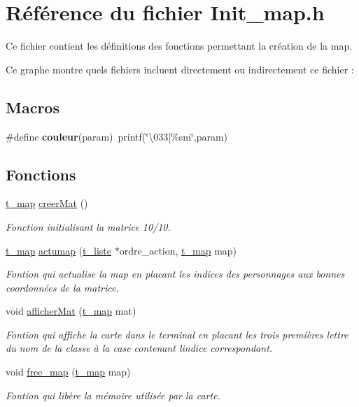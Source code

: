 \hypertarget{a00023}{}\section{Référence du fichier Init\+\_\+map.\+h}
\label{a00023}


Ce fichier contient les définitions des fonctions permettant la création de la map.  


Ce graphe montre quels fichiers incluent directement ou indirectement ce fichier \+:
\subsection*{Macros}
\begin{DoxyCompactItemize}
\item 
\#define {\bfseries couleur}(param)~printf(\char`\"{}\textbackslash{}033\mbox{[}\%sm\char`\"{},param)\hypertarget{a00023_aabcb2d6536b6c0ab41f99493c911489b}{}\label{a00023_aabcb2d6536b6c0ab41f99493c911489b}

\end{DoxyCompactItemize}
\subsection*{Fonctions}
\begin{DoxyCompactItemize}
\item 
\hyperlink{a00007}{t\+\_\+map} \hyperlink{a00023_aa36880d730a94fe537b0845567ed6d0f}{creer\+Mat} ()
\begin{DoxyCompactList}\small\item\em Fonction initialisant la matrice 10/10. \end{DoxyCompactList}\item 
\hyperlink{a00007}{t\+\_\+map} \hyperlink{a00023_a2744ef4e8151bb499b4306450e881575}{actumap} (\hyperlink{a00006}{t\+\_\+liste} $\ast$ordre\+\_\+action, \hyperlink{a00007}{t\+\_\+map} map)
\begin{DoxyCompactList}\small\item\em Fontion qui actualise la map en placant les indices des personnages aux bonnes coordonnées de la matrice. \end{DoxyCompactList}\item 
void \hyperlink{a00023_ae2c9b4412e1bd9fa4e80f205610e4b63}{afficher\+Mat} (\hyperlink{a00007}{t\+\_\+map} mat)
\begin{DoxyCompactList}\small\item\em Fontion qui affiche la carte dans le terminal en placant les trois premières lettre du nom de la classe à la case contenant l\textquotesingle{}indice correspondant. \end{DoxyCompactList}\item 
void \hyperlink{a00023_ad3c86013629f2211d3b15976051ff25b}{free\+\_\+map} (\hyperlink{a00007}{t\+\_\+map} map)
\begin{DoxyCompactList}\small\item\em Fontion qui libère la mémoire utilisée par la carte. \end{DoxyCompactList}\end{DoxyCompactItemize}


